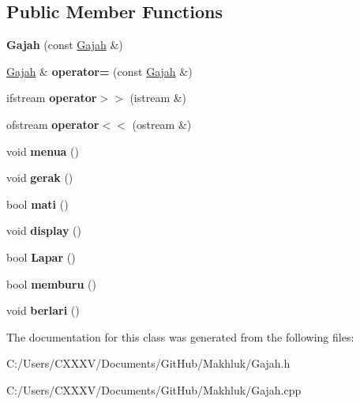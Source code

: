 \subsection*{Public Member Functions}
\begin{DoxyCompactItemize}
\item 
{\bfseries Gajah} (const \hyperlink{class_gajah}{Gajah} \&)\hypertarget{class_gajah_a077d7639b153d0c51bb4e458de4cbc9d}{}\label{class_gajah_a077d7639b153d0c51bb4e458de4cbc9d}

\item 
\hyperlink{class_gajah}{Gajah} \& {\bfseries operator=} (const \hyperlink{class_gajah}{Gajah} \&)\hypertarget{class_gajah_a1ec6d4ac29cf4bb30a1a4ed1faed25b4}{}\label{class_gajah_a1ec6d4ac29cf4bb30a1a4ed1faed25b4}

\item 
ifstream {\bfseries operator$>$$>$} (istream \&)\hypertarget{class_gajah_ac0588c64b3ed47acdb2f8534d7230440}{}\label{class_gajah_ac0588c64b3ed47acdb2f8534d7230440}

\item 
ofstream {\bfseries operator$<$$<$} (ostream \&)\hypertarget{class_gajah_ac9ee3e8e220e74b80661fd4e13048f64}{}\label{class_gajah_ac9ee3e8e220e74b80661fd4e13048f64}

\item 
void {\bfseries menua} ()\hypertarget{class_gajah_aa09948becb6eb9986df9c83b9c8034dc}{}\label{class_gajah_aa09948becb6eb9986df9c83b9c8034dc}

\item 
void {\bfseries gerak} ()\hypertarget{class_gajah_a675038577bc7f186c4312d4ba91183b5}{}\label{class_gajah_a675038577bc7f186c4312d4ba91183b5}

\item 
bool {\bfseries mati} ()\hypertarget{class_gajah_a4175c49edb5acc41dceae92b8ab90dca}{}\label{class_gajah_a4175c49edb5acc41dceae92b8ab90dca}

\item 
void {\bfseries display} ()\hypertarget{class_gajah_a0ac906365164ffadee708483d21481e6}{}\label{class_gajah_a0ac906365164ffadee708483d21481e6}

\item 
bool {\bfseries Lapar} ()\hypertarget{class_gajah_a2ab72068f895a539308c3fd6746c6814}{}\label{class_gajah_a2ab72068f895a539308c3fd6746c6814}

\item 
bool {\bfseries memburu} ()\hypertarget{class_gajah_ad030ec628a1e96f395102b3e951aea71}{}\label{class_gajah_ad030ec628a1e96f395102b3e951aea71}

\item 
void {\bfseries berlari} ()\hypertarget{class_gajah_a5cab71bf9f3ece5baa3fc90c29f0a598}{}\label{class_gajah_a5cab71bf9f3ece5baa3fc90c29f0a598}

\end{DoxyCompactItemize}


The documentation for this class was generated from the following files\+:\begin{DoxyCompactItemize}
\item 
C\+:/\+Users/\+C\+X\+X\+X\+V/\+Documents/\+Git\+Hub/\+Makhluk/Gajah.\+h\item 
C\+:/\+Users/\+C\+X\+X\+X\+V/\+Documents/\+Git\+Hub/\+Makhluk/Gajah.\+cpp\end{DoxyCompactItemize}
